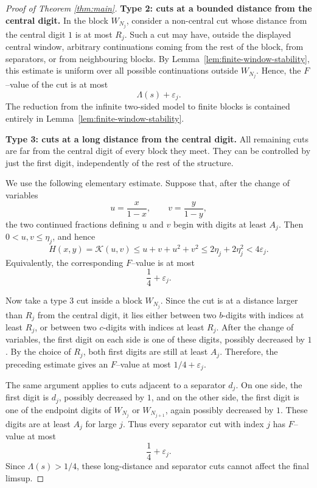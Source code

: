 \documentclass[11pt]{amsart}
\newcommand{\Kfun}{\mathcal K}
\begin{document}
\begin{proof}[Proof of Theorem \ref{thm:main}]
\textbf{Type 2: cuts at a bounded distance from the central digit.}
In the block $W_{N_j}$, consider a non-central cut whose distance from the central digit $1$ is at most $R_j$.  Such a cut may have, outside the displayed central window, arbitrary continuations coming from the rest of the block, from separators, or from neighbouring blocks. By Lemma~\ref{lem:finite-window-stability}, this estimate is uniform over all possible continuations outside $W_{N_j}$. Hence, the $F$--value of the cut is at most
$$
        \Lambda(s)+\varepsilon_j.
$$
The reduction from the infinite two-sided model to finite blocks is contained entirely in Lemma~\ref{lem:finite-window-stability}.


\textbf{Type 3: cuts at a long distance from the central digit.}
All remaining cuts are far from the central digit of every block they meet. They can be controlled by just the first digit, independently of the rest of the structure.

We use the following elementary estimate.  Suppose that, after the change of variables
$$
        u=\frac{x}{1-x},
        \qquad
        v=\frac{y}{1-y},
$$
the two continued fractions defining $u$ and $v$ begin with digits at least
$A_j$.  Then $0<u,v\le\eta_j$, and hence
$$
        H(x,y)=\Kfun(u,v)
        \le u+v+u^2+v^2
        \le 2\eta_j+2\eta_j^2
        <4\varepsilon_j.
$$
Equivalently, the corresponding $F$--value is at most
$$
        \frac14+\varepsilon_j.
$$

Now take a type 3 cut inside a block $W_{N_j}$.  Since the cut is at a distance larger than $R_j$ from the central digit, it lies either between two $b$-digits with indices at least $R_j$, or between two $c$-digits with indices at least
$R_j$.  After the change of variables, the first digit on each side is one of these digits, possibly decreased by $1$.  By the choice of $R_j$, both first digits are still at least $A_j$.  Therefore, the preceding estimate gives an $F$--value at most $1/4+\varepsilon_j$.

The same argument applies to cuts adjacent to a separator $d_j$.  On one side, the first digit is $d_j$, possibly decreased by $1$, and on the other side, the first digit is one of the endpoint digits of $W_{N_j}$ or $W_{N_{j+1}}$, again possibly decreased by $1$.  These digits are at least $A_j$ for large $j$. Thus every separator cut with index $j$ has $F$--value at most
$$
        \frac14+\varepsilon_j.
$$
Since $\Lambda(s)>1/4$, these long-distance and separator cuts cannot affect the final limsup.


\end{proof}
\end{document}
